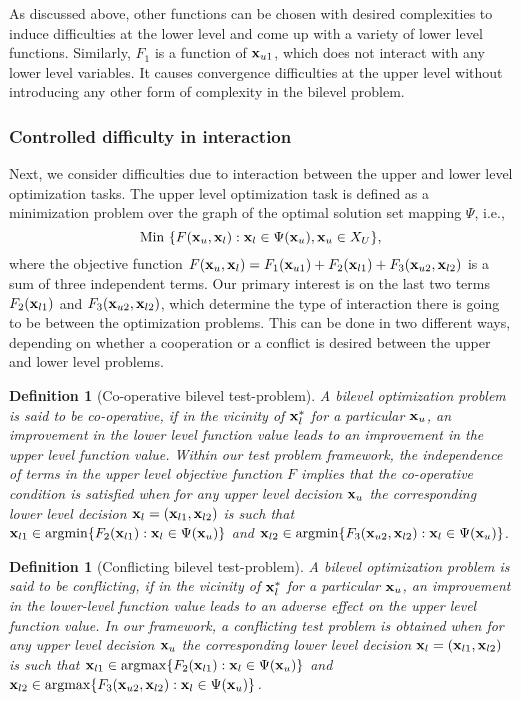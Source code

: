 \documentclass[twoside]{article}
\def\argmin{\mathop{\rm argmin}\limits}
\def\argmax{\mathop{\rm argmax}\limits}
\newtheorem{definition}[theorem]{Definition}
\begin{document}
As discussed above, other functions can be chosen with desired complexities to induce difficulties at the lower level and come up with a variety of lower level functions. Similarly, $F_1$ is a function of $\mbox{$\mathbf{x}$}_{u1}$, which does not interact with any lower level variables. It causes convergence difficulties at the upper level without introducing any other form of complexity in the bilevel problem.

\subsubsection{Controlled difficulty in interaction}
Next, we consider difficulties due to interaction between the upper and lower level optimization tasks. The upper level optimization task is defined as a minimization problem over the graph of the optimal solution set mapping $\Psi$, i.e.,
$$
\mbox{Min }\{F(\mbox{$\mathbf{x}$}_u,\mbox{$\mathbf{x}$}_l):\mbox{$\mathbf{x}$}_l\in\Psi(\mbox{$\mathbf{x}$}_u),\mbox{$\mathbf{x}$}_u\in X_U\},
$$ 
where the objective function
$F(\mbox{$\mathbf{x}$}_{u},\mbox{$\mathbf{x}$}_{l}) = F_1(\mbox{$\mathbf{x}$}_{u1}) + F_2(\mbox{$\mathbf{x}$}_{l1}) + F_3(\mbox{$\mathbf{x}$}_{u2},\mbox{$\mathbf{x}$}_{l2})$
is a sum of three independent terms. Our primary interest is on the last two terms $F_2(\mbox{$\mathbf{x}$}_{l1})$ and $F_3(\mbox{$\mathbf{x}$}_{u2},\mbox{$\mathbf{x}$}_{l2})$, which determine the type of interaction there is going to be between the optimization problems. This can be done in two different ways, depending on whether a cooperation or a conflict is desired between the upper and lower level problems.  

\vskip 0.2cm
\begin{definition}[Co-operative bilevel test-problem]
A bilevel optimization problem is said to be co-operative, if in the vicinity of $\mbox{$\mathbf{x}$}_{l}^{\ast}$ for a particular $\mbox{$\mathbf{x}$}_u$, an improvement in the lower level function value leads to an improvement in the upper level function value.  Within our test problem framework, the independence of terms in the upper level objective function $F$ implies that the co-operative condition is satisfied when for any upper level decision $\mbox{$\mathbf{x}$}_u$ the corresponding lower level decision $\mbox{$\mathbf{x}$}_l=(\mbox{$\mathbf{x}$}_{l1},\mbox{$\mathbf{x}$}_{l2})$ is such that $\boldx_{l1}\in\argmin\{F_2(\boldx_{l1}):\boldx_l\in\Psi(\boldx_u)\}$ and $\boldx_{l2}\in\argmin\{F_3(\boldx_{u2},\boldx_{l2}):\boldx_l\in\Psi(\boldx_u)\}$.
\end{definition}
\vskip 0.2cm

\vskip 0.2cm
\begin{definition}[Conflicting bilevel test-problem]
A bilevel optimization problem is said to be conflicting, if in the vicinity of $\mbox{$\mathbf{x}$}_{l}^{\ast}$ for a particular $\mbox{$\mathbf{x}$}_u$, an improvement in the lower-level function value leads to an adverse effect on the upper level function value. In our framework, a conflicting test problem is obtained when for any upper level decision $\mbox{$\mathbf{x}$}_u$ the corresponding lower level decision $\mbox{$\mathbf{x}$}_l=(\mbox{$\mathbf{x}$}_{l1},\mbox{$\mathbf{x}$}_{l2})$ is such that $\boldx_{l1}\in\argmax\{F_2(\boldx_{l1}):\boldx_l\in\Psi(\boldx_u)\}$ and $\boldx_{l2}\in\argmax\{F_3(\boldx_{u2},\boldx_{l2}):\boldx_l\in\Psi(\boldx_u)\}$.
\end{definition}
\vskip 0.2cm
\end{document}
